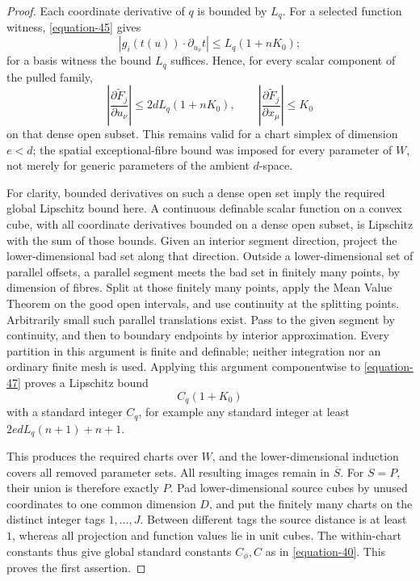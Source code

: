\documentclass[11pt,a4paper]{article}
\theoremstyle{definition}
\begin{document}
\begin{proof}
Each coordinate derivative of \(q\) is bounded by \(L_q\).
For a selected function witness, \eqref{equation-45} gives
\[
 |g_i(t(u))\cdot\partial_{u_\nu}t|
       \le L_q(1+nK_0);
\]
for a basis witness the bound \(L_q\) suffices. Hence, for every
scalar component of the pulled family,
\begin{equation}
 \left|\frac{\partial\widetilde F_j}{\partial u_\nu}\right|
 \le 2d L_q(1+nK_0),\qquad
 \left|\frac{\partial\widetilde F_j}{\partial x_\mu}\right|
 \le K_0
 \label{equation-47}
\end{equation}
on that dense open subset. This remains valid for a chart
simplex of dimension \(e<d\); the spatial exceptional-fibre
bound was imposed for every parameter of \(W\), not merely
for generic parameters of the ambient \(d\)-space.

For clarity, bounded derivatives on such a dense open set imply
the required global Lipschitz bound here. A continuous definable
scalar function on a convex cube, with all coordinate derivatives
bounded on a dense open subset, is Lipschitz with the sum of
those bounds. Given an interior segment direction, project the
lower-dimensional bad set along that direction. Outside a
lower-dimensional set of parallel offsets, a parallel segment
meets the bad set in finitely many points, by dimension of
fibres. Split at those finitely many points, apply the Mean
Value Theorem on the good open intervals, and use continuity
at the splitting points. Arbitrarily small such parallel
translations exist. Pass to the given segment by continuity,
and then to boundary endpoints by interior approximation.
Every partition in this argument is finite and definable;
neither integration nor an ordinary finite mesh is used.
Applying this argument componentwise to \eqref{equation-47} proves a
Lipschitz bound
\[
 C_q(1+K_0)
\]
with a standard integer \(C_q\), for example any standard
integer at least \(2edL_q(n+1)+n+1\).

This produces the required charts over \(W\), and the
lower-dimensional induction covers all removed parameter
sets. All resulting images remain in \(\overline S\).
For \(S=P\), their union is therefore exactly \(P\).
Pad lower-dimensional source cubes by unused coordinates to
one common dimension \(D\), and put the finitely many charts
on the distinct integer tags \(1,\ldots,J\). Between different
tags the source distance is at least \(1\), whereas all
projection and function values lie in unit cubes. The
within-chart constants thus give global standard constants
\(C_\phi,C\) as in \eqref{equation-40}. This proves the first assertion.


\end{proof}
\end{document}
